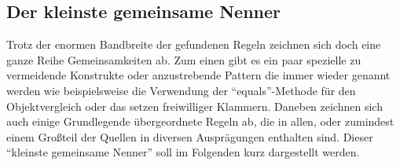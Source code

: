 \documentclass[da,ngerman]{stthesis}
\begin{document}
			\subsection{Der kleinste gemeinsame Nenner} \label{kleinernennerchapter}
			Trotz der enormen Bandbreite der gefundenen Regeln zeichnen sich doch eine ganze Reihe Gemeinsamkeiten ab. Zum einen gibt es ein paar spezielle zu vermeidende Konstrukte oder anzustrebende Pattern die immer wieder genannt werden wie beispielsweise die Verwendung der "`equals"'-Methode für den Objektvergleich oder das setzen freiwilliger Klammern. Daneben zeichnen sich auch einige Grundlegende übergeordnete Regeln ab, die in allen, oder zumindest einem Großteil der Quellen in diversen Ausprägungen enthalten sind. Dieser "`kleinste gemeinsame Nenner"' soll im Folgenden kurz dargestellt werden. \newline
\end{document}
